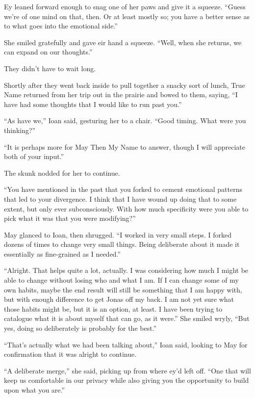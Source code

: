 Ey leaned forward enough to snag one of her paws and give it a squeeze. ``Guess we're of one mind on that, then. Or at least mostly so; you have a better sense as to what goes into the emotional side.''

She smiled gratefully and gave eir hand a squeeze. ``Well, when she returns, we can expand on our thoughts.''

They didn't have to wait long.

Shortly after they went back inside to pull together a snacky sort of lunch, True Name returned from her trip out in the prairie and bowed to them, saying, ``I have had some thoughts that I would like to run past you.''

``As have we,'' Ioan said, gesturing her to a chair. ``Good timing. What were you thinking?''

``It is perhaps more for May Then My Name to answer, though I will appreciate both of your input.''

The skunk nodded for her to continue.

``You have mentioned in the past that you forked to cement emotional patterns that led to your divergence. I think that I have wound up doing that to some extent, but only ever subconsciously. With how much specificity were you able to pick what it was that you were modifying?''

May glanced to Ioan, then shrugged. ``I worked in very small steps. I forked dozens of times to change very small things. Being deliberate about it made it essentially as fine-grained as I needed.''

``Alright. That helps quite a lot, actually. I was considering how much I might be able to change without losing who and what I am. If I can change some of my own habits, maybe the end result will still be something that I am happy with, but with enough difference to get Jonas off my back. I am not yet sure what those habits might be, but it is an option, at least. I have been trying to catalogue what it is about myself that can go, as it were.'' She smiled wryly, ``But yes, doing so deliberately is probably for the best.''

``That's actually what we had been talking about,'' Ioan said, looking to May for confirmation that it was alright to continue.

``A deliberate merge,'' she said, picking up from where ey'd left off. ``One that will keep us comfortable in our privacy while also giving you the opportunity to build upon what you are.''

